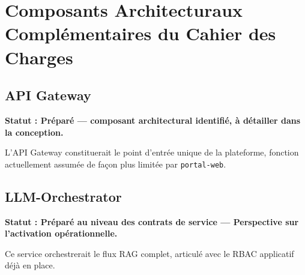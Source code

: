 \section{Composants Architecturaux Complémentaires du Cahier des Charges}

\subsection{API Gateway}
\textbf{Statut : Préparé — composant architectural identifié, à détailler dans la conception.}

L'API Gateway constituerait le point d'entrée unique de la plateforme, fonction actuellement assumée de façon plus limitée par \texttt{portal-web}.

\subsection{LLM-Orchestrator}
\textbf{Statut : Préparé au niveau des contrats de service — Perspective sur l'activation opérationnelle.}

Ce service orchestrerait le flux RAG complet, articulé avec le RBAC applicatif déjà en place.

